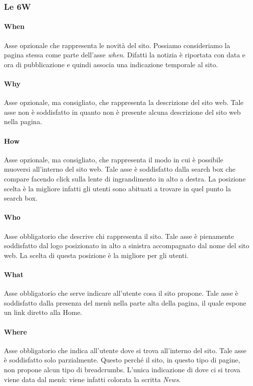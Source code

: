 \documentclass[../ProgettoTecWeb2.tex]{subfiles}
\begin{document}
		\subsubsection{Le 6W}
			\paragraph{When}
			Asse opzionale che rappresenta le novità del sito. Possiamo consideriamo la pagina stessa come parte dell'asse \textit{when}. Difatti la notizia è riportata con data e ora di pubblicazione e quindi associa una indicazione temporale al sito.

			\paragraph{Why}
			Asse opzionale, ma consigliato, che rappresenta la descrizione del sito web. Tale asse non è soddisfatto in quanto non è presente alcuna descrizione del sito web nella pagina.

			\paragraph{How}
			Asse opzionale, ma consigliato, che rappresenta il modo in cui è possibile muoversi all'interno del sito web. Tale asse è soddisfatto dalla search box che compare facendo click sulla lente di ingrandimento in alto a destra. La posizione scelta è la migliore infatti gli utenti sono abituati a trovare in quel punto la search box. 
			
			\paragraph{Who}
			Asse obbligatorio che descrive chi rappresenta il sito. Tale asse è pienamente soddisfatto dal logo posizionato in alto a sinistra accompagnato dal nome del sito web. La scelta di questa posizione è la migliore per gli utenti.

			\paragraph{What}
			Asse obbligatorio che serve indicare all'utente cosa il sito propone. Tale asse è soddisfatto dalla presenza del menù nella parte alta della pagina, il quale espone un link diretto alla Home.

			\paragraph{Where}
			Asse obbligatorio che indica all'utente dove si trova all'interno del sito. Tale asse è soddisfatto solo parzialmente. Questo perché il sito, in questo tipo di pagine, non propone alcun tipo di breadcrumbs. L'unica indicazione di dove ci si trova viene data dal menù: viene infatti colorata la scritta \textit{News}.
\end{document}
